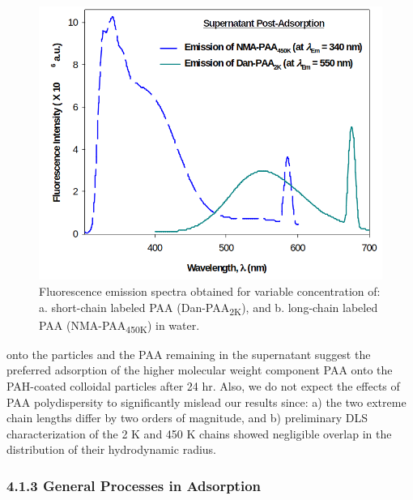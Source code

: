\documentclass[journal=mamobx,manuscript=article]{achemso}
\begin{document}
\begin{figure}[H]
\includegraphics[scale=1.75]{fig6.png}
\caption{Fluorescence emission spectra obtained for variable concentration of: a. short-chain labeled PAA (Dan-PAA\textsubscript{2K}), and b. long-chain labeled PAA (NMA-PAA\textsubscript{450K}) in water.}
\label{figure 6}
\end{figure}


onto the particles and the PAA remaining in the supernatant suggest the preferred adsorption of the higher molecular weight component PAA onto the PAH-coated colloidal particles after 24 hr.  Also, we do not expect the effects of PAA polydispersity to significantly mislead our results since: a) the two extreme chain lengths differ by two orders of magnitude, and b) preliminary DLS characterization of the 2 K and 450 K chains showed negligible overlap in the distribution of their hydrodynamic radius.

\subsubsection{4.1.3 General Processes in Adsorption}
\end{document}
